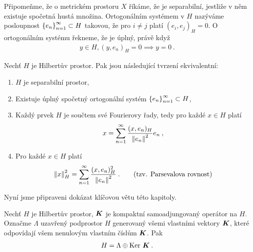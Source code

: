 Připomeňme, že o metrickém prostoru $X$ říkáme, že je separabilní, jestliže v něm existuje spočetná hustá množina. Ortogonálním systémem v $H$ nazýváme posloupnost $\left \lbrace e_n \right \rbrace_{n=1}^\infty \subset H$ takovou, že pro $i\neq j$ platí $(e_i,e_j)_H =0$. O ortogonálním systému řekneme, že je úplný, právě když \begin{align*}
    y \in H, (y,e_n)_H =0 \implies y = 0 \:.
\end{align*}

\begin{theorem} \label{4.fourier}
Nechť $H$ je Hilbertův prostor. Pak jsou následující tvrzení ekvivalentní: \begin{enumerate}
    \item $H$ je separabilní prostor,
    \item Existuje úplný spočetný ortogonální systém $\left \lbrace e_n \right \rbrace_{n=1}^\infty \subset H$,
    \item Každý prvek $H$ je součtem své Fourierovy řady, tedy pro každé $x \in H$ platí \begin{align*}
        x = \sum_{n=1}^\infty \dfrac{(x,e_n)_H}{\left\lVert e_n\right\rVert^2} e_n \:,
    \end{align*}
    \item Pro každé $x \in H$ platí \begin{align*}
        \left\lVert x\right\rVert_H^2 = \sum_{n=1}^\infty \dfrac{(x,e_n)^2_H}{\left\lVert e_n\right\rVert^2} \:. \qquad \text{(tzv. Parsevalova rovnost)}
    \end{align*}
\end{enumerate}
\end{theorem}

Nyní jsme připraveni dokázat klíčovou větu této kapitoly.
\begin{theorem} \label{4.Hilbert-Schmidt}
Nechť $H$ je Hilbertův prostor, $\boldsymbol{K}$ je kompaktní samoadjungovaný operátor na $H$. Označme $\Lambda$ uzavřený podprostor $H$ generovaný všemi vlastními vektory $\boldsymbol{K}$, které odpovídají všem nenulovým vlastním číslům $\boldsymbol{K}$. Pak \begin{align*}
    H = \Lambda \oplus \operatorname{Ker}\, \boldsymbol{K} \:.
\end{align*}
\end{theorem}

